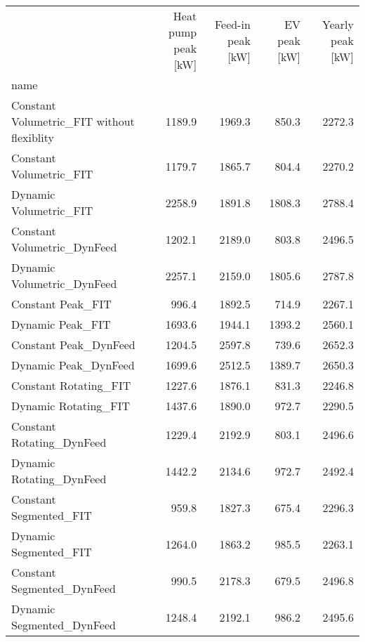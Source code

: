 \begin{tabular}{lrrrr}
\toprule
{} &  Heat pump peak [kW] &  Feed-in peak [kW] &  EV peak [kW] &  Yearly peak [kW] \\
name                                       &                      &                    &               &                   \\
\midrule
Constant Volumetric\_FIT without flexiblity &               1189.9 &             1969.3 &         850.3 &            2272.3 \\
Constant Volumetric\_FIT                    &               1179.7 &             1865.7 &         804.4 &            2270.2 \\
Dynamic Volumetric\_FIT                     &               2258.9 &             1891.8 &        1808.3 &            2788.4 \\
Constant Volumetric\_DynFeed                &               1202.1 &             2189.0 &         803.8 &            2496.5 \\
Dynamic Volumetric\_DynFeed                 &               2257.1 &             2159.0 &        1805.6 &            2787.8 \\
Constant Peak\_FIT                          &                996.4 &             1892.5 &         714.9 &            2267.1 \\
Dynamic Peak\_FIT                           &               1693.6 &             1944.1 &        1393.2 &            2560.1 \\
Constant Peak\_DynFeed                      &               1204.5 &             2597.8 &         739.6 &            2652.3 \\
Dynamic Peak\_DynFeed                       &               1699.6 &             2512.5 &        1389.7 &            2650.3 \\
Constant Rotating\_FIT                      &               1227.6 &             1876.1 &         831.3 &            2246.8 \\
Dynamic Rotating\_FIT                       &               1437.6 &             1890.0 &         972.7 &            2290.5 \\
Constant Rotating\_DynFeed                  &               1229.4 &             2192.9 &         803.1 &            2496.6 \\
Dynamic Rotating\_DynFeed                   &               1442.2 &             2134.6 &         972.7 &            2492.4 \\
Constant Segmented\_FIT                     &                959.8 &             1827.3 &         675.4 &            2296.3 \\
Dynamic Segmented\_FIT                      &               1264.0 &             1863.2 &         985.5 &            2263.1 \\
Constant Segmented\_DynFeed                 &                990.5 &             2178.3 &         679.5 &            2496.8 \\
Dynamic Segmented\_DynFeed                  &               1248.4 &             2192.1 &         986.2 &            2495.6 \\
\bottomrule
\end{tabular}
